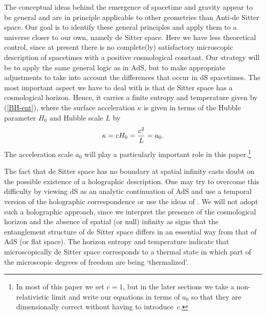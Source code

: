 \documentclass[a4paper,12pt]{article}
\newcommand{\be}{\begin{equation}}
\newcommand{\ee}{\end{equation}}
\begin{document}
The conceptual ideas behind the emergence of spacetime and gravity appear to be general and are in principle applicable to other geometries than Anti-de Sitter space.  Our goal is to 
identify these general principles and apply them to a universe closer to our 
own, namely de Sitter space. Here we have less theoretical control, since at present there is no 
complete(ly) satisfactory microscopic description of spacetimes with a positive cosmological
constant. Our strategy will be to apply the same general logic as in AdS, but to make appropriate adjustments to take into account the differences that occur in dS spacetimes. 
The most important aspect we have to deal with is that de Sitter space has a cosmological horizon. Hence, it carries a finite entropy and temperature  given by  (\ref{BH-ent}), where the surface acceleration $\kappa$ is given in terms of the Hubble parameter $H_0$ and Hubble scale $L$ by \cite{Gibbons-Hawking}
\be
\kappa = cH_0 = {c^2\over L}=a_0.
\ee
The acceleration scale $a_0$ will play a particularly important role in this paper.\footnote{In most of this paper we set $c=1$, but in the later sections we take a non-relativistic limit and write our equations in terms of $a_0$ so that they are dimensionally correct without having to introduce~$c$. } 


The fact that de Sitter space has no boundary at spatial infinity casts doubt on the possible 
 existence of a holographic description. One may try to overcome this difficulty by viewing dS as 
 an analytic continuation of AdS and use a temporal version of the holographic 
correspondence \cite{dS-CFT} or use the ideas of \cite{Banks}. We will not adopt such a holographic approach, since we interpret the presence of the cosmological horizon and the absence of spatial (or null) infinity as signs that 
the entanglement structure of de Sitter space differs in an essential way from that of AdS (or flat space).  The horizon entropy and temperature indicate that microscopically de Sitter space corresponds to a thermal state in which part of the microscopic degrees of freedom are being `thermalized'. %
\end{document}
